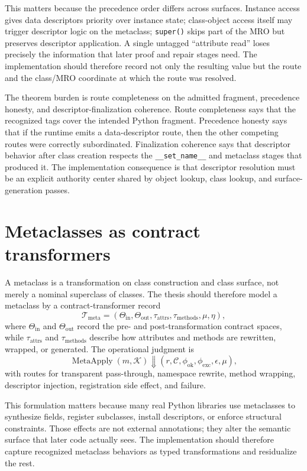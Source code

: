 \documentclass[11pt]{report}
\begin{document}
This matters because the precedence order differs across surfaces. Instance access gives data descriptors priority over instance state; class-object access itself may trigger descriptor logic on the metaclass; \texttt{super()} skips part of the MRO but preserves descriptor application. A single untagged ``attribute read'' loses precisely the information that later proof and repair stages need. The implementation should therefore record not only the resulting value but the route and the class/MRO coordinate at which the route was resolved.

The theorem burden is route completeness on the admitted fragment, precedence honesty, and descriptor-finalization coherence. Route completeness says that the recognized tags cover the intended Python fragment. Precedence honesty says that if the runtime emits a data-descriptor route, then the other competing routes were correctly subordinated. Finalization coherence says that descriptor behavior after class creation respects the \texttt{\_\_set\_name\_\_} and metaclass stages that produced it. The implementation consequence is that descriptor resolution must be an explicit authority center shared by object lookup, class lookup, and surface-generation passes.
\section{Metaclasses as contract transformers}
 A metaclass is a transformation on class construction and class surface, not merely a nominal superclass of classes. The thesis should therefore model a metaclass by a contract-transformer record
\[
\mathcal{T}_{\mathrm{meta}} = (\Theta_{\mathrm{in}},\Theta_{\mathrm{out}},\tau_{\mathrm{attrs}},\tau_{\mathrm{methods}},\mu,\eta),
\]
where $\Theta_{\mathrm{in}}$ and $\Theta_{\mathrm{out}}$ record the pre- and post-transformation contract spaces, while $\tau_{\mathrm{attrs}}$ and $\tau_{\mathrm{methods}}$ describe how attributes and methods are rewritten, wrapped, or generated. The operational judgment is
\[
\operatorname{MetaApply}(m,\mathcal{K}) \Downarrow (r,\mathcal{C},\phi_{\mathrm{ok}},\phi_{\mathrm{exc}},\epsilon,\mu),
\]
with routes for transparent pass-through, namespace rewrite, method wrapping, descriptor injection, registration side effect, and failure.

This formulation matters because many real Python libraries use metaclasses to synthesize fields, register subclasses, install descriptors, or enforce structural constraints. Those effects are not external annotations; they alter the semantic surface that later code actually sees. The implementation should therefore capture recognized metaclass behaviors as typed transformations and residualize the rest.
\end{document}
